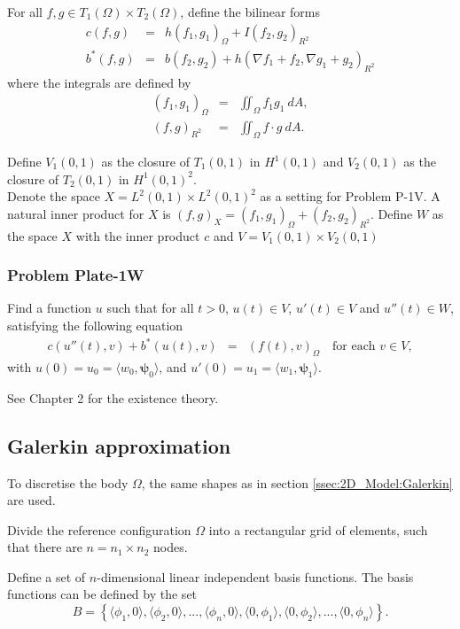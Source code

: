 \documentclass[../../main.tex]{subfiles}
\begin{document}
For all $f,g \in T_1(\Omega)\times T_2(\Omega) $, define the bilinear forms
\begin{eqnarray*}
	c(f,g) & = & h(f_1,g_1)_{\Omega} + I(f_2,g_2)_{R^2} \\
	b^*(f,g) & = & b(f_2,g_2) + h(\nabla f_1 + f_2, \nabla g_1 + g_2)_{R^2}
\end{eqnarray*}
where the integrals are defined by
\begin{eqnarray*}
	(f_1,g_1)_{\Omega} & = & \iint_\Omega f_1 g_1 \ dA,\\
	(f,g)_{R^2} & = & \iint_\Omega f \cdot g \ dA.
\end{eqnarray*}

Define $V_1(0,1)$ as the closure of $T_1(0,1)$ in $H^1(0,1)$ and $V_2(0,1)$ as the closure of $T_2(0,1)$ in $H^1(0,1)^2$.\\

Denote the space $X = L^2(0,1)\times L^2(0,1)^2$ as a setting for Problem P-1V. A natural inner product for $X$ is $(f,g)_X = (f_1,g_1)_{\Omega} + (f_2,g_2)_{R^2}$.  Define $W$ as the space $X$ with the inner product $c$ and $V = V_1(0,1) \times V_2(0,1)$

\subsubsection{Problem Plate-1W}
Find a function $u$ such that for all $t>0$, $u(t) \in V$, $u'(t) \in V$ and $u''(t) \in W$, satisfying the following equation
\begin{eqnarray}
	c(u''(t),v) + b^*(u(t),v) & = & (f(t),v)_{\Omega} \ \ \ \textrm{ for each } v \in V,
\end{eqnarray} with $u(0)= u_0 = \langle w_0, \boldsymbol\psi_0 \rangle$, and $u'(0)= u_1 = \langle w_1, \boldsymbol\psi_1 \rangle$.

See Chapter 2 for the existence theory.

\subsection{Galerkin approximation}
To discretise the body $\Omega$, the same shapes as in section \ref{ssec:2D_Model:Galerkin} are used.

Divide the reference configuration $\Omega$ into a rectangular grid of elements, such that there are $n = n_1 \times n_2$ nodes.

Define a set of $n$-dimensional linear independent basis functions. The basis functions can be defined by the set $$B = \left\{\langle\phi_1, 0\rangle, \langle\phi_2, 0\rangle,...,\langle\phi_{n}, 0 \rangle,\langle 0,\phi_1\rangle,\langle 0 ,\phi_2\rangle,...,\langle 0,\phi_{n}\rangle \right\}.$$ 
\end{document}
